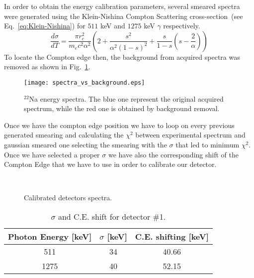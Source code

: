 In order to obtain the energy calibration parameters, several smeared spectra were generated using the  Klein-Nishina Compton Scattering cross-section~(see Eq.~\ref{eq:Klein-Nishina}) for $511$ keV and $1275$ keV $\gamma$ respectively.
\begin{equation}
\dfrac{d\sigma}{dT} = \dfrac{\pi r_e^2}{m_ec^2\alpha^2}\left(2+\dfrac{s^2}{\alpha^2(1-s)^2}+\dfrac{s}{1-s} \left(s-\dfrac{2}{\alpha}\right) \right)
\label{eq:Klein-Nishina}
\end{equation}
To locate the Compton edge then, the background from acquired spectra was removed  as shown in Fig.~\ref{fig: compton back}.
\begin{figure}[h!]
\centering
\texttt{[image: spectra\_vs\_background.eps]}
\caption{$^{22}$Na energy spectra. The blue one represent the original acquired spectrum, while the red one is obtained by background removal.}
\label{fig: compton back}
\end{figure}
Once we have the compton edge position we have to loop on every previous generated smearing and calculating the $\chi^2$ between experimental spectrum and gaussian smeared one selecting the smearing with the $\sigma$ that led to minimum $\chi^2$. Once we have selected a proper $\sigma$ we have also the corresponding shift of the Compton Edge that we have to use in order to calibrate our detector.

\begin{figure}[h!]
\centering
{} \quad
{} \\
\caption{Calibrated detectors spectra.}
\label{fig: calibrated energy spectra}
\end{figure}

\begin{table}[h!]
\centering
\begin{tabular}{ccc}
\toprule
\toprule
Photon Energy [keV] & $\sigma$ [keV] & C.E. shifting [keV] \\
\midrule
511 & 34& 40.66 \\
1275 & 40 & 52.15\\
\bottomrule
\bottomrule
\end{tabular}
\caption{$\sigma$ and C.E. shift for detector \#1.}
\end{table}

